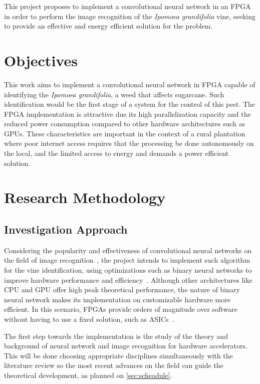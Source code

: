 \documentclass[
	12pt,				%
	oneside,			%
	a4paper,			%
	brazil,			    %
	french,				%
	spanish,			%
	english,			%
	]{abntex2}
\begin{document}
  This project proposes to implement a convolutional neural network in an FPGA in order to perform the image recognition of the \textit{Ipomoea grandifolia} vine, seeking to provide an effective and energy efficient solution for the problem.
  
    
\chapter[Objectives]{Objectives}
 
 This work aims to implement a convolutional neural network in FPGA capable of identifying the \textit{Ipomoea grandifolia}, a weed that affects sugarcane. Such identification would be the first stage of a system for the control of this pest. The FPGA implementation is attractive due its high parallelization capacity and the reduced power consumption compared to other hardware architectures such as GPUs. These characteristics are important in the context of a rural plantation where poor internet access requires that the processing be done  autonomously on the local, and the limited access to energy and demands a power efficient solution.
 
 

\chapter[Research Methodology]{Research Methodology}
\section{Investigation Approach}

Considering the popularity and effectiveness of convolutional neural networks on the field of image recognition~\cite{LeCun2015}, the project intends to implement such algorithm for the vine identification, using optimizations such as binary neural networks to improve hardware performance and efficiency~\cite{Nurvitadhi2017_0, Courbariaux2015}. Although other architectures like CPU and GPU offer high peak theoretical performance, the nature of binary neural network makes its implementation on customizable hardware more efficient. In this scenario, FPGAs provide orders of magnitude over software without having to use a fixed solution, such as ASICs~\cite{Courbariaux2015}.

The first step towards the implementation is the study of the theory and background of neural network and image recognition for hardware accelerators. This will be done choosing appropriate disciplines simultaneously with the literature review so the most recent advances on the field can guide the theoretical development, as planned on \autoref{sec:scheadule}. 
\end{document}
